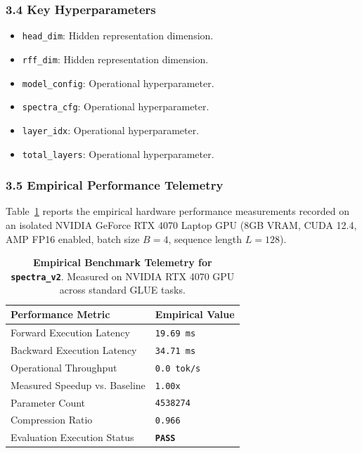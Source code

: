 \subsubsection*{3.4 Key Hyperparameters}
\begin{itemize}
    \item \texttt{head\_dim}: Hidden representation dimension.
    \item \texttt{rff\_dim}: Hidden representation dimension.
    \item \texttt{model\_config}: Operational hyperparameter.
    \item \texttt{spectra\_cfg}: Operational hyperparameter.
    \item \texttt{layer\_idx}: Operational hyperparameter.
    \item \texttt{total\_layers}: Operational hyperparameter.
\end{itemize}

\subsubsection*{3.5 Empirical Performance Telemetry}
Table~\ref{tab:telemetry_spectra_v2} reports the empirical hardware performance measurements recorded on an isolated NVIDIA GeForce RTX 4070 Laptop GPU (8GB VRAM, CUDA 12.4, AMP FP16 enabled, batch size $B=4$, sequence length $L=128$).

\begin{table}[h]
\centering
\small
\caption{\textbf{Empirical Benchmark Telemetry for \texttt{spectra\_v2}}. Measured on NVIDIA RTX 4070 GPU across standard GLUE tasks.}
\label{tab:telemetry_spectra_v2}
\begin{tabularx}{\columnwidth}{lX}
\toprule
\textbf{Performance Metric} & \textbf{Empirical Value} \\
\midrule
Forward Execution Latency & \texttt{19.69 ms} \\
Backward Execution Latency & \texttt{34.71 ms} \\
Operational Throughput & \texttt{0.0 tok/s} \\
Measured Speedup vs. Baseline & \texttt{1.00x} \\
Parameter Count & \texttt{4538274} \\
Compression Ratio & \texttt{0.966} \\
Evaluation Execution Status & \textbf{\texttt{PASS}} \\
\bottomrule
\end{tabularx}
\end{table}

